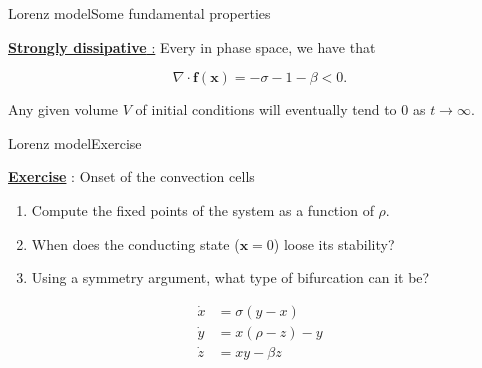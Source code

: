 \documentclass[usenames, dvipsnames, aspectratio=169]{beamer}
\begin{document}
\begin{frame}[t, c]{Lorenz model}{Some fundamental properties}
  \vfill
  \large

  \underline{\textbf{Strongly dissipative} :} Every in phase space, we have that

  \[
  \nabla \cdot \bm{f}(\bm{x}) = -\sigma - 1 - \beta < 0.
  \]

  \bigskip

  Any given volume $V$ of initial conditions will eventually tend to 0 as $t \to \infty$.

  \vfill
\end{frame}

\begin{frame}[t, c]{Lorenz model}{Exercise}
  \vfill
  \large

  \begin{minipage}{.68\textwidth}
    \underline{\textbf{Exercise}} : Onset of the convection cells

    \bigskip

    \begin{enumerate}
    \item Compute the fixed points of the system as a function of $\rho$.

    \item When does the conducting state ($\bm{x} = 0$) loose its stability?

    \item Using a symmetry argument, what type of bifurcation can it be?
    \end{enumerate}
  \end{minipage}%
  \hfill
  \begin{minipage}{.28\textwidth}
    \[
    \begin{aligned}
      \dot{x} & = \sigma \left( y - x \right) \\
      \dot{y} & = x \left( \rho - z \right) - y \\
      \dot{z} & = xy - \beta z
    \end{aligned}
    \]
  \end{minipage}

  \vfill
\end{frame}
\end{document}
